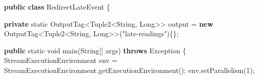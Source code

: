 \documentclass[cn,11pt,chinese]{elegantbook}
\newenvironment{Shaded}{}{}
\newcommand{\BuiltInTok}[1]{#1}
\newcommand{\DataTypeTok}[1]{\textcolor[rgb]{0.56,0.13,0.00}{#1}}
\newcommand{\DecValTok}[1]{\textcolor[rgb]{0.25,0.63,0.44}{#1}}
\newcommand{\FunctionTok}[1]{\textcolor[rgb]{0.02,0.16,0.49}{#1}}
\newcommand{\KeywordTok}[1]{\textcolor[rgb]{0.00,0.44,0.13}{\textbf{#1}}}
\newcommand{\NormalTok}[1]{#1}
\newcommand{\StringTok}[1]{\textcolor[rgb]{0.25,0.44,0.63}{#1}}
\begin{document}
\begin{Shaded}
\begin{Highlighting}[]
\KeywordTok{public} \KeywordTok{class}\NormalTok{ RedirectLateEvent \{}

    \KeywordTok{private} \DataTypeTok{static}\NormalTok{ OutputTag\textless{}Tuple2\textless{}}\BuiltInTok{String}\NormalTok{, }\BuiltInTok{Long}\NormalTok{\textgreater{}\textgreater{} output = }\KeywordTok{new}\NormalTok{ OutputTag\textless{}Tuple2\textless{}}\BuiltInTok{String}\NormalTok{, }\BuiltInTok{Long}\NormalTok{\textgreater{}\textgreater{}(}\StringTok{"late{-}readings"}\NormalTok{)\{\};}

    \KeywordTok{public} \DataTypeTok{static} \DataTypeTok{void} \FunctionTok{main}\NormalTok{(}\BuiltInTok{String}\NormalTok{[] args) }\KeywordTok{throws} \BuiltInTok{Exception}\NormalTok{ \{}
\NormalTok{        StreamExecutionEnvironment env = StreamExecutionEnvironment.}\FunctionTok{getExecutionEnvironment}\NormalTok{();}
\NormalTok{        env.}\FunctionTok{setParallelism}\NormalTok{(}\DecValTok{1}\NormalTok{);}


\end{Highlighting}
\end{Shaded}
\end{document}
